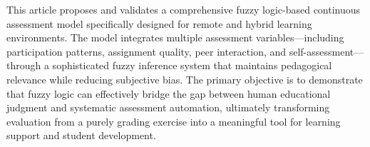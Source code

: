 This article proposes and validates a comprehensive fuzzy logic-based continuous assessment model specifically designed for remote and hybrid learning environments. The model integrates multiple assessment variables—including participation patterns, assignment quality, peer interaction, and self-assessment—through a sophisticated fuzzy inference system that maintains pedagogical relevance while reducing subjective bias. The primary objective is to demonstrate that fuzzy logic can effectively bridge the gap between human educational judgment and systematic assessment automation, ultimately transforming evaluation from a purely grading exercise into a meaningful tool for learning support and student development.

